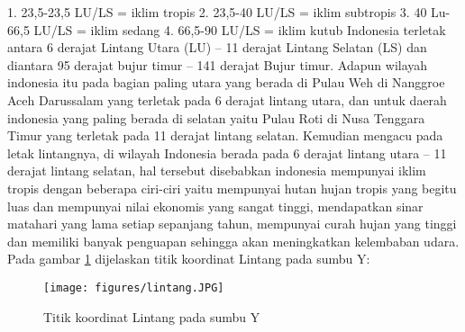 1. 23,5-23,5 LU/LS = iklim tropis
2. 23,5-40 LU/LS = iklim subtropis
3. 40 Lu-66,5 LU/LS = iklim sedang
4. 66,5-90 LU/LS = iklim kutub
Indonesia terletak antara 6 derajat Lintang Utara (LU) – 11 derajat Lintang Selatan (LS) dan diantara 95 derajat bujur timur – 141 derajat Bujur timur.
Adapun wilayah indonesia itu pada bagian paling utara yang berada di Pulau Weh di Nanggroe Aceh Darussalam yang terletak pada 6 derajat lintang utara, dan untuk daerah indonesia yang paling berada di selatan yaitu Pulau Roti di Nusa Tenggara Timur yang terletak pada 11 derajat lintang selatan. Kemudian mengacu pada letak lintangnya, di wilayah Indonesia berada pada 6 derajat lintang utara – 11 derajat lintang selatan, hal tersebut disebabkan indonesia mempunyai iklim tropis dengan beberapa ciri-ciri yaitu mempunyai hutan hujan tropis yang begitu luas dan mempunyai nilai ekonomis yang sangat tinggi, mendapatkan sinar matahari yang lama setiap sepanjang tahun, mempunyai curah hujan yang tinggi dan memiliki banyak penguapan sehingga akan meningkatkan kelembaban udara.
Pada gambar \ref{lintang} dijelaskan titik koordinat Lintang pada sumbu Y:
\begin{figure}[ht]
	\centerline{\texttt{[image: figures/lintang.JPG]}}
	\caption{Titik koordinat Lintang pada sumbu Y}
	\label{lintang}
	\end{figure}

